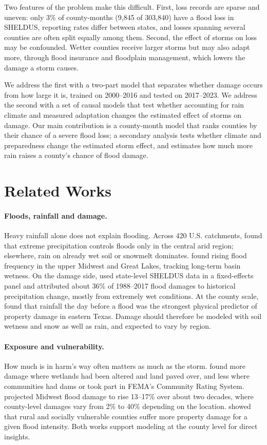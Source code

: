 \documentclass[10pt,twocolumn]{article}
\begin{document}
Two features of the problem make this difficult. First, loss records are sparse and uneven:
only 3\% of county-months (9,845 of 303,840) have a flood loss in SHELDUS, reporting rates differ between states,
and losses spanning several counties are often split equally among them. Second, the effect of
storms on loss may be confounded. Wetter counties receive larger storms but may also adapt more,
through flood insurance and floodplain management, which lowers the damage a storm causes.

We address the first with a two-part model that separates whether damage occurs from how large
it is, trained on 2000--2016 and tested on 2017--2023. We address the second with a set of
causal models that test whether accounting for rain climate and measured adaptation changes
the estimated effect of storms on damage. Our main contribution is a county-month model that ranks counties by their chance of a severe flood loss; a secondary analysis tests whether climate and preparedness change the estimated storm effect, and estimates how much more rain raises a county's chance of flood damage.


\section{Related Works}

\paragraph{Floods, rainfall and damage.}
Heavy rainfall alone does not explain flooding. Across 420 U.S. catchments,
\citet{berghuijs2016} found that extreme precipitation controls floods only in the central arid region; elsewhere, rain on already wet soil or snowmelt dominates. \citet{slater2016} found rising flood frequency in the upper Midwest and Great Lakes, tracking long-term basin wetness. On the damage side, \citet{davenport2021} used state-level SHELDUS data in a fixed-effects panel and attributed about 36\% of 1988--2017 flood damages to historical precipitation change, mostly from extremely wet conditions. At the county scale, \citet{brody2008} found that rainfall the day before a flood was the strongest physical predictor of property damage in eastern Texas. Damage should therefore be modeled with soil wetness and snow as well as rain, and expected to vary by region.

\paragraph{Exposure and vulnerability.}
How much is in harm's way often matters as much as the storm. \citet{brody2008} found more damage where wetlands had been altered and land paved over, and less where communities had dams or took part in FEMA's Community Rating System. \citet{liu2015} projected Midwest flood damage to rise 13--17\% over about two decades, where county-level damages vary from 2\% to 40\% depending on the location.\citet{tellman2020} showed that rural and socially vulnerable counties suffer more property damage for a given flood intensity. Both works support modeling at the county level for direct insights.
\end{document}
